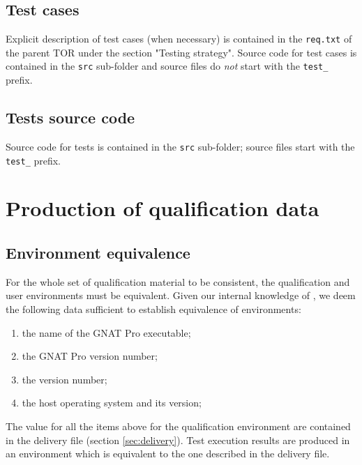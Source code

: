 \documentclass {report}
\begin{document}
\subsection{Test cases}
Explicit description of test cases (when necessary) is contained in the \texttt{req.txt} of the parent TOR under the section "Testing strategy". Source code for test cases is contained in the \texttt{src} sub-folder and source files do \emph{not} start with the \texttt{test\_} prefix. 

\subsection{Tests source code}
Source code for tests is contained in the \texttt{src} sub-folder; source files start with the \texttt{test\_} prefix. 

\section{Production of qualification data}

\subsection{Environment equivalence}
\label{sec:equivalence}
For the whole set of qualification material to be consistent, the qualification and user environments must be equivalent. Given our internal knowledge of \xcov, we deem the following data sufficient to establish equivalence of environments:
\begin{enumerate}
\item the name of the GNAT Pro executable;
\item the GNAT Pro version number;
\item the \xcov version number;
\item the host operating system and its version;
\end{enumerate}
The value for all the items above for the qualification environment are contained in the delivery file (section \ref{sec:delivery}). Test execution results are produced in an environment which is equivalent to the one described in the delivery file. 
\end{document}
